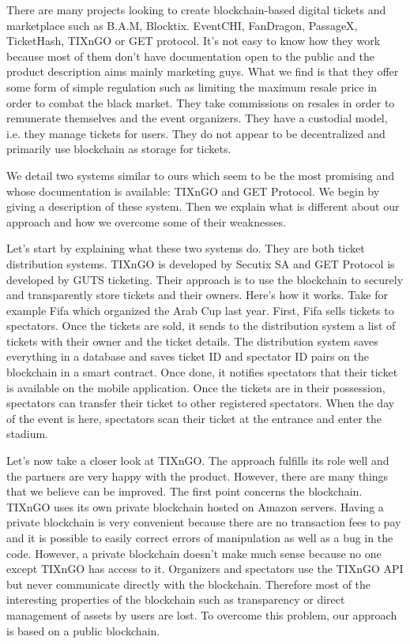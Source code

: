 \documentclass[a4paper,11pt,oneside]{report}
\begin{document}
There are many projects looking to create blockchain-based digital tickets and marketplace such as B.A.M, Blocktix. EventCHI, FanDragon, PassageX, TicketHash, TIXnGO or GET protocol. It's not easy to know how they work because most of them don't have documentation open to the public and the product description aims mainly marketing guys. What we find is that they offer some form of simple regulation such as limiting the maximum resale price in order to combat the black market. They take commissions on resales in order to remunerate themselves and the event organizers. They have a custodial model, i.e. they manage tickets for users. They do not appear to be decentralized and primarily use blockchain as storage for tickets.

We detail two systems similar to ours which seem to be the most promising and whose documentation is available: TIXnGO and GET Protocol. We begin by giving a description of these system. Then we explain what is different about our approach and how we overcome some of their weaknesses.

Let's start by explaining what these two systems do. They are both ticket distribution systems. TIXnGO is developed by Secutix SA and GET Protocol is developed by GUTS ticketing. Their approach is to use the blockchain to securely and transparently store tickets and their owners. Here's how it works. Take for example Fifa which organized the Arab Cup last year. First, Fifa sells tickets to spectators. Once the tickets are sold, it sends to the distribution system a list of tickets with their owner and the ticket details. The distribution system saves everything in a database and saves ticket ID and spectator ID pairs on the blockchain in a smart contract. Once done, it notifies spectators that their ticket is available on the mobile application. Once the tickets are in their possession, spectators can transfer their ticket to other registered spectators. When the day of the event is here, spectators scan their ticket at the entrance and enter the stadium.

Let's now take a closer look at TIXnGO. The approach fulfills its role well and the partners are very happy with the product. However, there are many things that we believe can be improved. The first point concerns the blockchain. TIXnGO uses its own private blockchain hosted on Amazon servers. Having a private blockchain is very convenient because there are no transaction fees to pay and it is possible to easily correct errors of manipulation as well as a bug in the code. However, a private blockchain doesn't make much sense because no one except TIXnGO has access to it. Organizers and spectators use the TIXnGO API but never communicate directly with the blockchain. Therefore most of the interesting properties of the blockchain such as transparency or direct management of assets by users are lost. To overcome this problem, our approach is based on a public blockchain.
\end{document}
